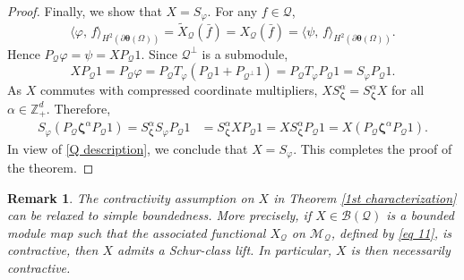 \documentclass[12pt,reqno]{amsart}
\newtheorem{remark}[theorem]{\bf Remark}%
\theoremstyle{remark}
\theoremstyle{definition}
\newcommand{\beqn}{\begin{eqnarray*}}
\newcommand{\eeqn}{\end{eqnarray*}}
\newcommand{\inp}[2]{\langle{#1},\,{#2} \rangle}
\begin{document}
\begin{proof}
Finally, we show that $X=S_{\varphi}.$ For any $f\in \mathcal{Q}$,
$$ \inp{\varphi}{f}_{H^2(\partial\boldsymbol\theta(\Omega))} = \widetilde{X}_{\mathcal{Q}}(\bar{f}) = X_{\mathcal{Q}}(\bar{f})= \inp{\psi}{f}_{H^2(\partial\boldsymbol\theta(\Omega))}. $$
Hence $P_{\mathcal{Q}} \varphi = \psi=XP_{\mathcal{Q}}1.$
Since $\mathcal{Q}^\perp$ is a submodule,
$$ XP_{\mathcal{Q}}1= P_{\mathcal{Q}}\varphi = P_{\mathcal{Q}} T_{\varphi}(P_{\mathcal{Q}}1 + P_{\mathcal{Q}^\perp}1) = P_{\mathcal{Q}} T_{\varphi}P_{\mathcal{Q}}1 = S_{\varphi} P_{\mathcal{Q}}1. $$
As $X$ commutes with compressed coordinate multipliers, $XS_{ \boldsymbol \zeta}^\alpha=S_{ \boldsymbol \zeta}^\alpha X$ for all $\alpha\in \mathbb Z_+^d.$ 
Therefore, 
\beqn
    S_{\varphi}(P_{\mathcal{Q}} \boldsymbol \zeta^\alpha P_{\mathcal{Q}}1) = S_{\boldsymbol \zeta}^\alpha S_{\varphi} P_{\mathcal{Q}}1 
    &= S_{\boldsymbol \zeta}^\alpha X P_{\mathcal{Q}}1 = X S_{\boldsymbol \zeta}^\alpha P_{\mathcal{Q}}1 = X (P_{\mathcal{Q}} \boldsymbol \zeta^\alpha P_{\mathcal{Q}}1).
\eeqn
In view of \eqref{Q description}, we conclude that $X=S_{\varphi}.$ This completes the proof of the theorem.
\end{proof}


\begin{remark}
The contractivity assumption on $X$ in Theorem \ref{1st characterization} can be relaxed to simple boundedness. More precisely, if $X\in \mathcal{B}(\mathcal{Q})$ is a bounded module map such that the associated functional $X_{\mathcal{Q}}$ on $\mathcal{M}_{\mathcal{Q}}$, defined by \eqref{eq 11}, is contractive, then $X$ admits a Schur-class lift. In particular, $X$ is then necessarily contractive.
\end{remark}
\end{document}
